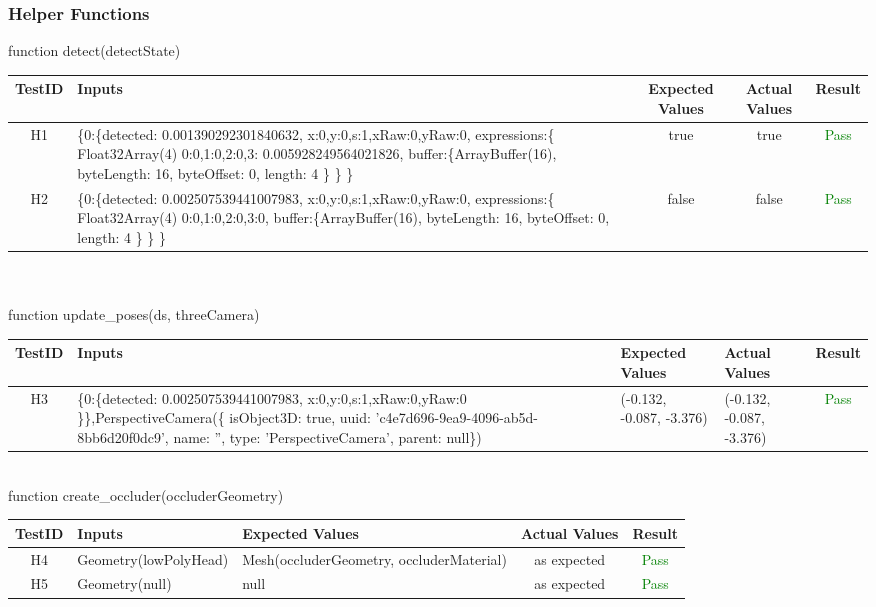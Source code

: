 \documentclass[12pt, titlepage]{article}
\begin{document}
\subsubsection{Helper Functions}
function detect(detectState)\\
\begin{tabular}{ |c|p{5cm}|c|c|c| } 
 \hline
 TestID & Inputs & Expected Values & Actual Values & Result \\ 
 \hline
 H1 & \{0:\{detected: 0.001390292301840632, x:0,y:0,s:1,xRaw:0,yRaw:0, expressions:\{
Float32Array(4) 0:0,1:0,2:0,3: 0.005928249564021826,
buffer:\{ArrayBuffer(16), byteLength: 16, byteOffset: 0, length: 4
\}
\}
 \} & true & true & \textcolor{green}{Pass} \\ 

 H2 & \{0:\{detected: 0.002507539441007983, x:0,y:0,s:1,xRaw:0,yRaw:0, expressions:\{
Float32Array(4) 0:0,1:0,2:0,3:0,
buffer:\{ArrayBuffer(16), byteLength: 16, byteOffset: 0, length: 4
\}
\}
 \} & false & false & \textcolor{green}{Pass} \\ 
 \hline
\end{tabular}\\
\\
function update\_poses(ds, threeCamera)\\
\begin{tabular}{ |c|p{5cm}|p{3cm}|p{3cm}|c| } 
 \hline
 TestID & Inputs & Expected Values & Actual Values & Result \\ 
 \hline
 H3 & \{0:\{detected: 0.002507539441007983, x:0,y:0,s:1,xRaw:0,yRaw:0
\}\},PerspectiveCamera(\{ isObject3D: true, uuid: 'c4e7d696-9ea9-4096-ab5d-8bb6d20f0dc9', name: '', type: 'PerspectiveCamera', parent: null\}) & (-0.132, -0.087, -3.376) & (-0.132, -0.087, -3.376) & \textcolor{green}{Pass} \\ 
 \hline
\end{tabular}
\\
function create\_occluder(occluderGeometry)\\
\begin{tabular}{ |c|p{5cm}|p{4.6cm}|c|c| } 
 \hline
 TestID & Inputs & Expected Values & Actual Values & Result \\ 
 \hline
 H4 & Geometry(lowPolyHead) & Mesh(occluderGeometry, occluderMaterial) & as expected & \textcolor{green}{Pass} \\ 
 H5 & Geometry(null) & null & as expected & \textcolor{green}{Pass} \\ 
 \hline
\end{tabular}
\\
\end{document}
